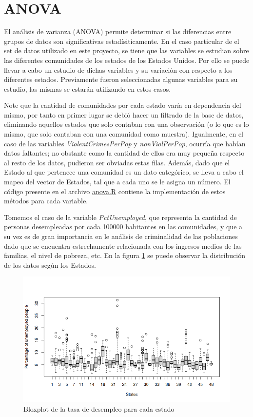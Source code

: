 \documentclass[a4paper,10pt,twocolumn]{article}
\begin{document}
\section{ANOVA}

El análisis de varianza (ANOVA) permite determinar si las diferencias entre grupos de datos son significativas estadísiticamente. En el caso particular de el set de datos utilizado en este proyecto, se tiene que las variables se estudian sobre las diferentes comunidades de los estados de los Estados Unidos. Por ello se puede llevar a cabo un estudio de dichas variables y su variación con respecto a los diferentes estados. Previamente fueron seleccionadas algunas variables para su estudio, las mismas se estarán utilizando en estos casos.

Note que la cantidad de comunidades por cada estado varía en dependencia del mismo, por tanto en primer lugar se debió hacer un filtrado de la base de datos, eliminando aquellos estados que solo contaban con una observación (o lo que es lo mismo, que solo contaban con una comunidad como muestra). Igualmente, en el caso de las variables \textit{ViolentCrimesPerPop} y \textit{nonViolPerPop}, ocurría que habían datos faltantes; no obstante como la cantidad de ellos era muy pequeña respecto al resto de los datos, pudieron ser obviadas estas filas. Además, dado que el Estado al que pertenece una comunidad es un dato categórico, se lleva a cabo el mapeo del vector de Estados, tal que a cada uno se le asigna un número. El código presente en el archivo \href{anova.R}{anova.R} contiene la implementación de estos métodos para cada variable.

Tomemos el caso de la variable \textit{PctUnemployed}, que representa la cantidad de personas desempleadas por cada 100000 habitantes en las comunidades, y que a su vez es de gran importancia en le análisis de criminalidad de las poblaciones dado que se encuentra estrechamente relacionada con los ingresos medios de las familias, el nivel de pobreza, etc. En la figura \ref{fig:unemployed_boxplot} se puede observar la distribución de los datos según los Estados.
	
\begin{figure}[htb]
	\begin{center}
		\includegraphics[width=\columnwidth]{figures/Unemployed_plot.png}
	\end{center}
	\caption{Bloxplot de la tasa de desempleo para cada estado \label{fig:unemployed_boxplot}}
\end{figure}
\end{document}
